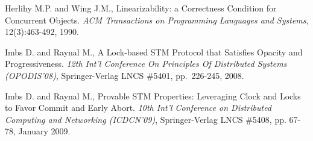 \begin{thebibliography}{99}
{%
% 
% 
% 
% 



Herlihy M.P.  and Wing J.M.,
Linearizability: a Correctness Condition for Concurrent Objects. 
{\it ACM Transactions on Programming Languages and Systems}, 
12(3):463-492, 1990. 

% 
% 
% 





Imbs D. and Raynal M.,
A Lock-based STM Protocol  that Satisfies Opacity and Progressiveness. 
{\it 12th Int'l Conference On Principles Of Distributed Systems
(OPODIS'08)},   Springer-Verlag LNCS  \#5401, pp.~226-245, 2008. 


Imbs D. and Raynal M.,
Provable STM Properties: Leveraging Clock and Locks to Favor Commit 
and Early Abort.
{\it 10th Int'l Conference on Distributed Computing and  Networking
(ICDCN'09)},  Springer-Verlag LNCS  \#5408, pp. 67-78, January 2009. 



}
\end{thebibliography}
